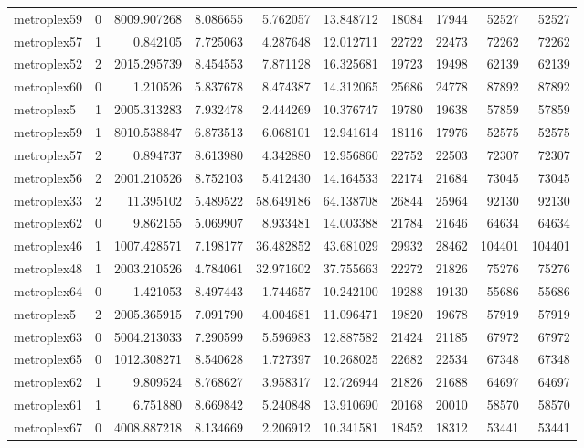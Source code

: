 \begin{longtable}{|l|r|r|r|r|r|r|r|r|r|}
metroplex59 & 0 & 8009.907268 & 8.086655 & 5.762057 & 13.848712 & 18084 & 17944 & 52527 & 52527 \\
metroplex57 & 1 & 0.842105 & 7.725063 & 4.287648 & 12.012711 & 22722 & 22473 & 72262 & 72262 \\
metroplex52 & 2 & 2015.295739 & 8.454553 & 7.871128 & 16.325681 & 19723 & 19498 & 62139 & 62139 \\
metroplex60 & 0 & 1.210526 & 5.837678 & 8.474387 & 14.312065 & 25686 & 24778 & 87892 & 87892 \\
metroplex5 & 1 & 2005.313283 & 7.932478 & 2.444269 & 10.376747 & 19780 & 19638 & 57859 & 57859 \\
metroplex59 & 1 & 8010.538847 & 6.873513 & 6.068101 & 12.941614 & 18116 & 17976 & 52575 & 52575 \\
metroplex57 & 2 & 0.894737 & 8.613980 & 4.342880 & 12.956860 & 22752 & 22503 & 72307 & 72307 \\
metroplex56 & 2 & 2001.210526 & 8.752103 & 5.412430 & 14.164533 & 22174 & 21684 & 73045 & 73045 \\
metroplex33 & 2 & 11.395102 & 5.489522 & 58.649186 & 64.138708 & 26844 & 25964 & 92130 & 92130 \\
metroplex62 & 0 & 9.862155 & 5.069907 & 8.933481 & 14.003388 & 21784 & 21646 & 64634 & 64634 \\
metroplex46 & 1 & 1007.428571 & 7.198177 & 36.482852 & 43.681029 & 29932 & 28462 & 104401 & 104401 \\
metroplex48 & 1 & 2003.210526 & 4.784061 & 32.971602 & 37.755663 & 22272 & 21826 & 75276 & 75276 \\
metroplex64 & 0 & 1.421053 & 8.497443 & 1.744657 & 10.242100 & 19288 & 19130 & 55686 & 55686 \\
metroplex5 & 2 & 2005.365915 & 7.091790 & 4.004681 & 11.096471 & 19820 & 19678 & 57919 & 57919 \\
metroplex63 & 0 & 5004.213033 & 7.290599 & 5.596983 & 12.887582 & 21424 & 21185 & 67972 & 67972 \\
metroplex65 & 0 & 1012.308271 & 8.540628 & 1.727397 & 10.268025 & 22682 & 22534 & 67348 & 67348 \\
metroplex62 & 1 & 9.809524 & 8.768627 & 3.958317 & 12.726944 & 21826 & 21688 & 64697 & 64697 \\
metroplex61 & 1 & 6.751880 & 8.669842 & 5.240848 & 13.910690 & 20168 & 20010 & 58570 & 58570 \\
metroplex67 & 0 & 4008.887218 & 8.134669 & 2.206912 & 10.341581 & 18452 & 18312 & 53441 & 53441 \\

\end{longtable}
